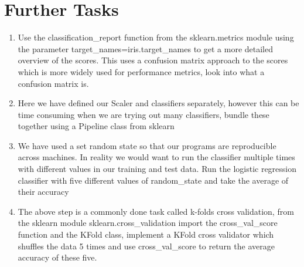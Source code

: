 \documentclass[12pt]{article}
\begin{document}
\begin{enumerate}
%


\end{enumerate}

\section{Further Tasks}
\begin{enumerate}
\item Use the classification\_report function from the sklearn.metrics module using the parameter target\_names=iris.target\_names to get a more detailed overview of the scores. This uses a confusion matrix approach to the scores which is more widely used for performance metrics, look into what a confusion matrix is.
\item Here we have defined our Scaler and classifiers separately, however this can be time consuming when we are trying out many classifiers, bundle these together using a Pipeline class from sklearn

\item We have used a set random state so that our programs are reproducible across machines. In reality we would want to run the classifier multiple times with different values in our training and test data. Run the logistic regression classifier with five different values of random\_state and take the average of their accuracy
\item The above step is a commonly done task called k-folds cross validation, from the sklearn module sklearn.cross\_validation import the cross\_val\_score function and the KFold class, implement a KFold cross validator which shuffles the data 5 times and use cross\_val\_score to return the average accuracy of these five.
\end{enumerate}
\end{document}
